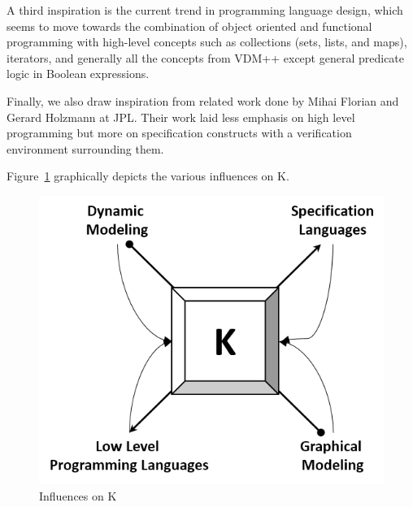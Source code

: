 \documentclass{llncs}
\newcommand{\lang}{K}
\begin{document}

A third inspiration is the current trend in programming language
design, which seems to move towards the combination of object oriented
and functional programming with high-level concepts such as
collections (sets, lists, and maps), iterators, and generally all the
concepts from VDM++ except general predicate logic in Boolean
expressions. 

Finally, we also draw inspiration from related work done by Mihai
Florian and Gerard Holzmann at JPL. Their work laid less emphasis on
high level programming but more on specification constructs with a
verification environment surrounding them.

Figure~\ref{fig:influences} graphically depicts the various influences
on \lang{}. 

\begin{figure}
  \label{fig:influences}
  \includegraphics[scale=0.75]{influences.png}
  \centering
  \caption{Influences on \lang{}}
\end{figure}
\end{document}
